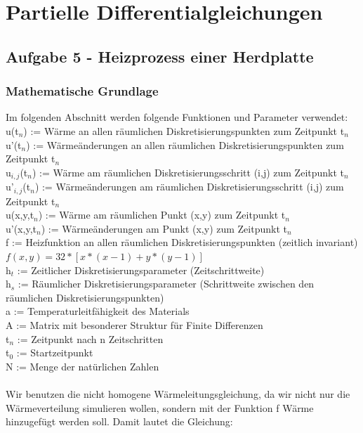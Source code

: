 \documentclass{report}
\begin{document}
\section{Partielle Differentialgleichungen}
\subsection{Aufgabe 5 - Heizprozess einer Herdplatte}

\subsubsection{Mathematische Grundlage}
Im folgenden Abschnitt werden folgende Funktionen und Parameter verwendet:\\
u(t$_{n}$) := Wärme an allen räumlichen Diskretisierungspunkten zum Zeitpunkt t$_{n}$\\
u'(t$_{n}$) := Wärmeänderungen an allen räumlichen Diskretisierungspunkten zum Zeitpunkt t$_{n}$\\
u$_{i,j}$(t$_{n}$) := Wärme am räumlichen Diskretisierungsschritt (i,j) zum Zeitpunkt t$_{n}$\\
u'$_{i,j}$(t$_{n}$) := Wärmeänderungen am räumlichen Diskretisierungsschritt (i,j) zum Zeitpunkt t$_{n}$\\
u(x,y,t$_{n}$) := Wärme am räumlichen Punkt (x,y) zum Zeitpunkt t$_{n}$\\
u'(x,y,t$_{n}$) := Wärmeänderungen am Punkt (x,y) zum Zeitpunkt t$_{n}$\\
f := Heizfunktion an allen räumlichen Diskretisierungspunkten (zeitlich invariant) $f(x,y) = 32 * [x*(x-1)+y*(y-1)]$\\
h$_{t}$ := Zeitlicher Diskretisierungsparameter (Zeitschrittweite)\\
h$_{s}$ := Räumlicher Diskretisierungsparameter (Schrittweite zwischen den räumlichen Diskretisierungspunkten)\\
a := Temperaturleitfähigkeit des Materials \\
A := Matrix mit besonderer Struktur für Finite Differenzen\\
t$_{n}$ := Zeitpunkt nach n Zeitschritten\\
t$_{0}$ := Startzeitpunkt\\
N := Menge der natürlichen Zahlen\\
\\
Wir benutzen die nicht homogene Wärmeleitungsgleichung, da wir nicht nur die Wärmeverteilung simulieren wollen, sondern mit der Funktion f Wärme hinzugefügt werden soll. Damit lautet die Gleichung:\\
\end{document}
